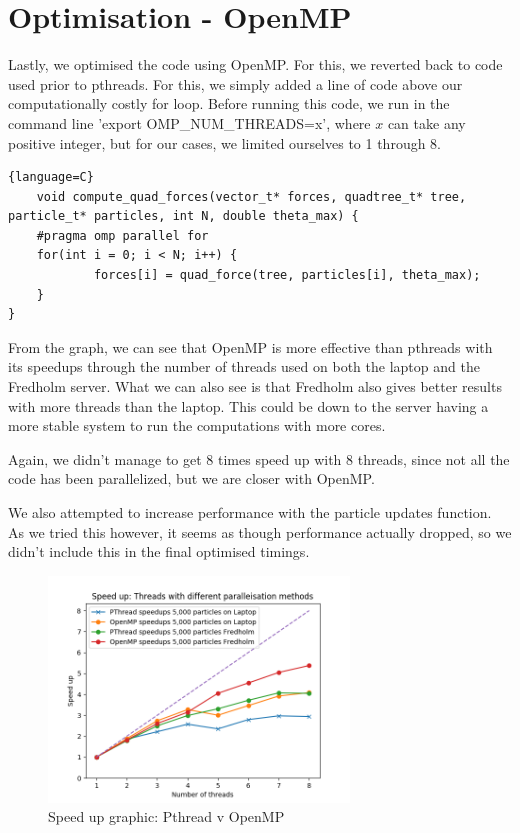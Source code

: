 \section{Optimisation - OpenMP}
Lastly, we optimised the code using OpenMP. For this, we reverted back to code used prior to pthreads. For this, we simply added a line of code above our computationally costly for loop. Before running this code, we run in the command line 'export OMP\_NUM\_THREADS=x', where $x$ can take any positive integer, but for our cases, we limited ourselves to 1 through 8.
\begin{lstlisting}{language=C}
    void compute_quad_forces(vector_t* forces, quadtree_t* tree, particle_t* particles, int N, double theta_max) {
    #pragma omp parallel for
    for(int i = 0; i < N; i++) {
            forces[i] = quad_force(tree, particles[i], theta_max);
    }
}
\end{lstlisting}
From the graph, we can see that OpenMP is more effective than pthreads with its speedups through the number of threads used on both the laptop and the Fredholm server. What we can also see is that Fredholm also gives better results with more threads than the laptop. This could be down to the server having a more stable system to run the computations with more cores.

Again, we didn't manage to get 8 times speed up with 8 threads, since not all the code has been parallelized, but we are closer with OpenMP.

We also attempted to increase performance with the particle updates function. As we tried this however, it seems as though performance actually dropped, so we didn't include this in the final optimised timings.

\begin{figure}[htb]
  \begin{center}
    \includegraphics[width=8cm]{../images/openmpVpthread1.png}
    \caption{Speed up graphic: Pthread v OpenMP}
  \end{center}
\end{figure}
\newpage
